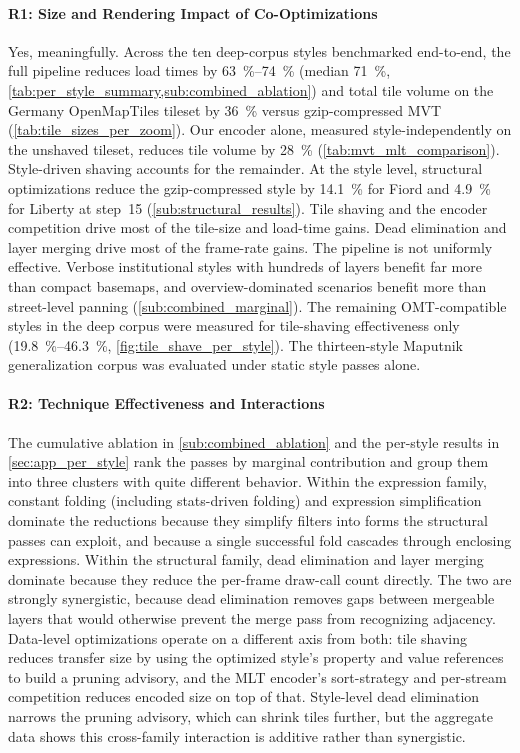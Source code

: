 \paragraph{R1: Size and Rendering Impact of Co-Optimizations}
Yes, meaningfully.
Across the ten deep-corpus styles benchmarked end-to-end, the full pipeline reduces load times by \qtyrange{63}{74}{\percent} (median \qty{71}{\percent}, \cref{tab:per_style_summary,sub:combined_ablation}) and total tile volume on the Germany OpenMapTiles tileset by \qty{36}{\percent} versus gzip-compressed \ac{MVT} (\cref{tab:tile_sizes_per_zoom}).
Our encoder alone, measured style-independently on the unshaved tileset, reduces tile volume by \qty{28}{\percent} (\cref{tab:mvt_mlt_comparison}).
Style-driven shaving accounts for the remainder.
At the style level, structural optimizations reduce the gzip-compressed style by \qty{14.1}{\percent} for Fiord and \qty{4.9}{\percent} for Liberty at step~15 (\cref{sub:structural_results}).
Tile shaving and the encoder competition drive most of the tile-size and load-time gains.
Dead elimination and layer merging drive most of the frame-rate gains.
The pipeline is not uniformly effective.
Verbose institutional styles with hundreds of layers benefit far more than compact basemaps, and overview-dominated scenarios benefit more than street-level panning (\cref{sub:combined_marginal}).
The remaining \ac{OMT}-compatible styles in the deep corpus were measured for tile-shaving effectiveness only (\qtyrange{19.8}{46.3}{\percent}, \cref{fig:tile_shave_per_style}).
The thirteen-style Maputnik generalization corpus was evaluated under static style passes alone.

\paragraph{R2: Technique Effectiveness and Interactions}
The cumulative ablation in \cref{sub:combined_ablation} and the per-style results in \cref{sec:app_per_style} rank the passes by marginal contribution and group them into three clusters with quite different behavior.
Within the expression family, constant folding (including stats-driven folding) and expression simplification dominate the reductions because they simplify filters into forms the structural passes can exploit, and because a single successful fold cascades through enclosing expressions.
Within the structural family, dead elimination and layer merging dominate because they reduce the per-frame draw-call count directly.
The two are strongly synergistic, because dead elimination removes gaps between mergeable layers that would otherwise prevent the merge pass from recognizing adjacency.
Data-level optimizations operate on a different axis from both: tile shaving reduces transfer size by using the optimized style's property and value references to build a pruning advisory, and the \ac{MLT} encoder's sort-strategy and per-stream competition reduces encoded size on top of that.
Style-level dead elimination narrows the pruning advisory, which can shrink tiles further, but the aggregate data shows this cross-family interaction is additive rather than synergistic.

